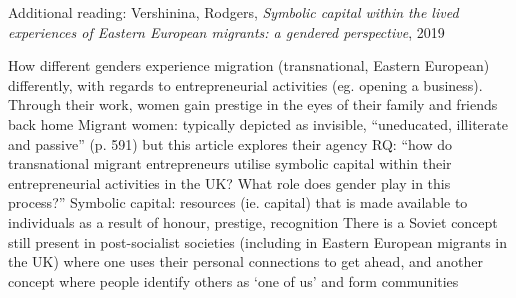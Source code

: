 \documentclass{article}
\begin{document}
Additional reading: Vershinina, Rodgers, \textit{Symbolic capital within the lived experiences of Eastern European migrants: a gendered perspective}, 2019

\begin{outline}
	\1 How different genders experience migration (transnational, Eastern European) differently, with regards to entrepreneurial activities (eg. opening a business). Through their work, women gain prestige in the eyes of their family and friends back home
	\1 Migrant women: typically depicted as invisible, ``uneducated, illiterate and passive'' (p. 591) but this article explores their agency
	\1 RQ: ``how do transnational migrant entrepreneurs utilise symbolic capital within their entrepreneurial activities in the UK? What role does gender play in this process?''
	\1 Symbolic capital: resources (ie. capital) that is made available to individuals as a result of honour, prestige, recognition
		\2 There is a Soviet concept still present in post-socialist societies (including in Eastern European migrants in the UK) where one uses their personal connections to get ahead, and another concept where people identify others as `one of us' and form communities
\end{outline}

\subsubsection{\textit{}}

\begin{outline}

\end{outline}
\end{document}
